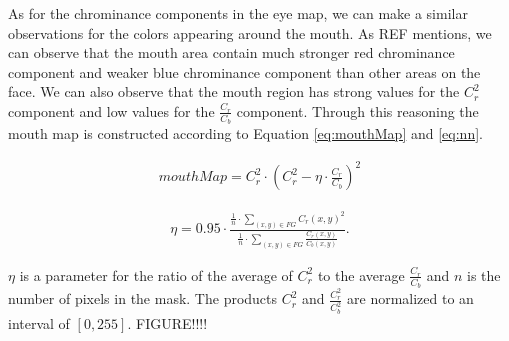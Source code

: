 As for the chrominance components in the eye map, we can make a similar observations for the colors appearing around the mouth. As REF mentions, we can observe that the mouth area contain much stronger red chrominance component and weaker blue chrominance component than other areas on the face. We can also observe that the mouth region has strong values for the $C_r^2$ component and low values for the $\frac{C_r}{C_b}$ component. Through this reasoning the mouth map is constructed according to Equation \ref{eq:mouthMap} and \ref{eq:nn}.

\begin{equation} \label{eq:mouthMap}
\begin{split}
mouthMap = C_r^2 \cdot (C_r^2 - \eta \cdot \frac{C_r}{C_b})^2
\end{split}
\end{equation}

\begin{equation} \label{eq:nn}
\begin{split}
\eta = 0.95 \cdot \frac{\frac{1}{n} \cdot \sum\limits_{(x,y) \in FG} C_r(x,y)^2}{\frac{1}{n} \cdot \sum\limits_{(x,y) \in FG} \frac{C_r(x,y)}{C_b(x,y)}}.
\end{split}
\end{equation}

$\eta$ is a parameter for the ratio of the average of $C_r^2$ to the average $\frac{C_r}{C_b}$ and $n$ is the number of pixels in the mask. The products $C_r^2$ and $\frac{C_r^2}{C_b^2}$ are normalized to an interval of $[0,255]$. FIGURE!!!!